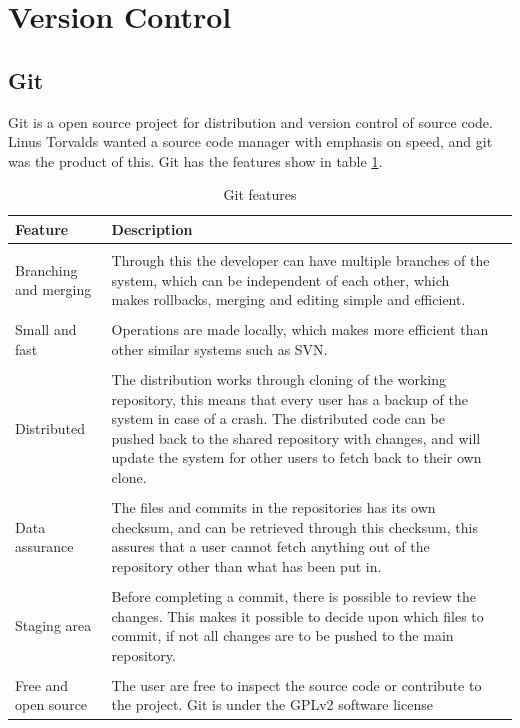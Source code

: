 \section{Version Control}
\subsection{Git}
Git is a open source project for distribution and version control of source code. Linus Torvalds wanted a source code manager with emphasis on speed, and git was the product of this. Git has the features show in table \ref{table-gitfeatures}.

\begin{table}
\centering
\begin{tabularx}{\textwidth}{ l X l }
  \textbf{Feature}      & \textbf{Description} \\
  \hline \\ [-1.5ex]
  Branching and merging & Through this the developer can have multiple branches of the system, which can be independent of each other, which makes rollbacks, merging and editing simple and efficient. \vspace*{0.7ex} \\
  \hline \\ [-1.5ex]
  Small and fast        & Operations are made locally, which makes more efficient than other similar systems such as SVN. \\
  \hline \\ [-1.5ex]
  Distributed           & The distribution works through cloning of the working repository, this means that every user has a backup of the system in case of a crash. The distributed code can be pushed back to the shared repository with changes, and will update the system for other users to fetch back to their own clone. \\
  \hline \\ [-1.5ex]
  Data assurance        & The files and commits in the repositories has its own checksum, and can be retrieved through this checksum, this assures that a user cannot fetch anything out of the repository other than what has been put in. \\
  \hline \\ [-1.5ex]
  Staging area          & Before completing a commit, there is possible to review the changes. This makes it possible to decide upon which files to commit, if not all changes are to be pushed to the main repository. \\
  \hline \\ [-1.5ex]
  Free and open source  & The user are free to inspect the source code or contribute to the project. Git is under the GPLv2 software license\\
\end{tabularx}
\caption{Git features}
\label{table-gitfeatures}
\end{table}

